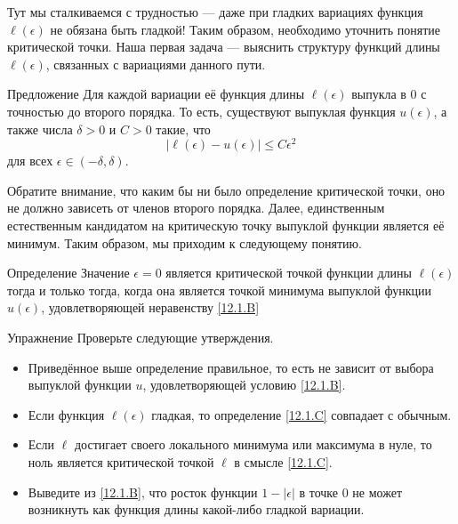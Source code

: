 Тут мы сталкиваемся с трудностью — даже при гладких вариациях функция $\ell(\epsilon)$ не обязана быть гладкой!
Таким образом, необходимо уточнить понятие критической точки.
Наша первая задача — выяснить структуру функций длины
$\ell(\epsilon)$, связанных с вариациями данного пути. 


\begin{ex}{Предложение}\label{12.1.B}
Для каждой вариации её функция длины $\ell(\epsilon)$ выпукла в $0$ с точностью до
второго порядка. 
То есть, существуют выпуклая функция $u(\epsilon)$, а также числа
$\delta > 0$ и $C > 0$ такие, что  
\[|\ell(\epsilon) - u(\epsilon)| \le C\epsilon^2\]
для всех $\epsilon \in (-\delta, \delta)$.
\end{ex}

Обратите внимание, что каким бы ни было определение критической точки,
оно не должно зависеть от членов второго порядка. 
Далее, единственным естественным кандидатом на критическую точку выпуклой
функции является её минимум. 
Таким образом, мы приходим к следующему понятию.

\begin{ex}{Определение}\label{12.1.C}
Значение $\epsilon = 0$ является критической точкой функции длины $\ell(\epsilon)$ тогда и только тогда, когда она является точкой минимума выпуклой функции $u(\epsilon)$, удовлетворяющей неравенству \ref{12.1.B}
\end{ex}

\begin{ex}{Упражнение}\label{12.1.D}
Проверьте следующие утверждения.
\begin{itemize}

\item Приведённое выше определение правильное, то есть не зависит от выбора выпуклой функции $u$, удовлетворяющей условию \ref{12.1.B}.


\item Если функция $\ell(\epsilon)$ гладкая, то определение \ref{12.1.C} совпадает с обычным.


\item Если $\ell$ достигает своего локального минимума или максимума в
  нуле, то ноль является критической точкой $\ell$ в смысле
  \ref{12.1.C}. 


\item Выведите из \ref{12.1.B}, что росток функции $1 - |\epsilon|$
  в точке $0$ не может возникнуть как функция длины какой-либо гладкой
  вариации.
\end{itemize}
\end{ex}

